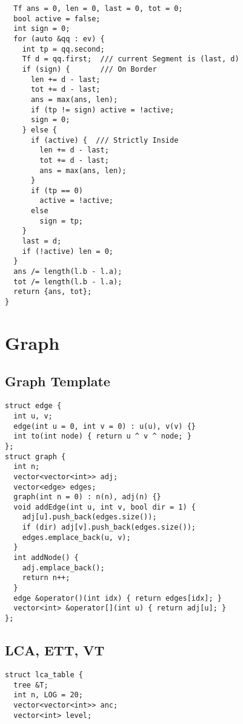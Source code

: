 \documentclass[FSZ,a4paper,onesided]{article}
\begin{document}
\begin{multicols*}{\COLS}
\begin{lstlisting}
  Tf ans = 0, len = 0, last = 0, tot = 0;
  bool active = false;
  int sign = 0;
  for (auto &qq : ev) {
    int tp = qq.second;
    Tf d = qq.first;  /// current Segment is (last, d)
    if (sign) {       /// On Border
      len += d - last;
      tot += d - last;
      ans = max(ans, len);
      if (tp != sign) active = !active;
      sign = 0;
    } else {
      if (active) {  /// Strictly Inside
        len += d - last;
        tot += d - last;
        ans = max(ans, len);
      }
      if (tp == 0)
        active = !active;
      else
        sign = tp;
    }
    last = d;
    if (!active) len = 0;
  }
  ans /= length(l.b - l.a);
  tot /= length(l.b - l.a);
  return {ans, tot};
}
\end{lstlisting}
\section{Graph}
\subsection{Graph Template}
\begin{lstlisting}
struct edge {
  int u, v;
  edge(int u = 0, int v = 0) : u(u), v(v) {}
  int to(int node) { return u ^ v ^ node; }
};
struct graph {
  int n;
  vector<vector<int>> adj;
  vector<edge> edges;
  graph(int n = 0) : n(n), adj(n) {}
  void addEdge(int u, int v, bool dir = 1) {
    adj[u].push_back(edges.size());
    if (dir) adj[v].push_back(edges.size());
    edges.emplace_back(u, v);
  }
  int addNode() {
    adj.emplace_back();
    return n++;
  }
  edge &operator()(int idx) { return edges[idx]; }
  vector<int> &operator[](int u) { return adj[u]; }
};
\end{lstlisting}
\subsection{LCA, ETT, VT}
\begin{lstlisting}
struct lca_table {
  tree &T;
  int n, LOG = 20;
  vector<vector<int>> anc;
  vector<int> level;


\end{lstlisting}
\end{multicols*}
\end{document}
